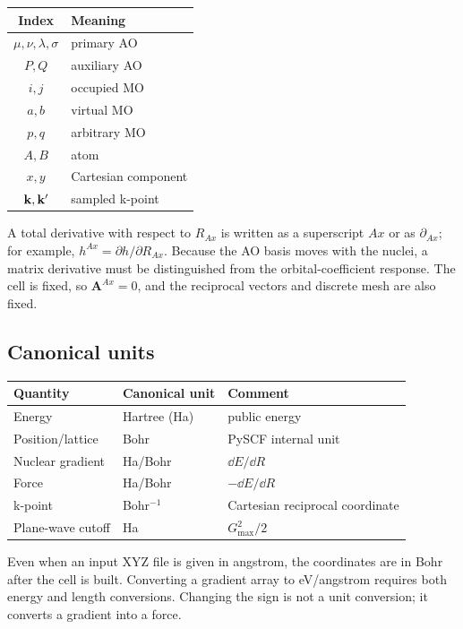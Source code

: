 \begin{center}
\begin{tabular}{cl}
\toprule
Index & Meaning \\
\midrule
$\mu,\nu,\lambda,\sigma$ & primary AO \\
$P,Q$ & auxiliary AO \\
$i,j$ & occupied MO \\
$a,b$ & virtual MO \\
$p,q$ & arbitrary MO \\
$A,B$ & atom \\
$x,y$ & Cartesian component \\
$\mathbf{k},\mathbf{k}'$ & sampled k-point \\
\bottomrule
\end{tabular}
\end{center}

A total derivative with respect to $R_{Ax}$ is written as a superscript $Ax$
or as $\partial_{Ax}$; for example,
$h^{Ax}=\partial h/\partial R_{Ax}$.  Because the AO basis moves with the
nuclei, a matrix derivative must be distinguished from the orbital-coefficient
response.  The cell is fixed, so $\mathbf A^{Ax}=0$, and the reciprocal vectors
and discrete mesh are also fixed.

\subsection{Canonical units}

\begin{center}
\begin{tabular}{lll}
\toprule
Quantity & Canonical unit & Comment \\
\midrule
Energy & Hartree (Ha) & public energy \\
Position/lattice & Bohr & PySCF internal unit \\
Nuclear gradient & Ha/Bohr & $\dd E/\dd R$ \\
Force & Ha/Bohr & $-\dd E/\dd R$ \\
k-point & Bohr$^{-1}$ & Cartesian reciprocal coordinate \\
Plane-wave cutoff & Ha & $G_{\max}^2/2$ \\
\bottomrule
\end{tabular}
\end{center}

Even when an input XYZ file is given in angstrom, the coordinates are in Bohr
after the cell is built.  Converting a gradient array to eV/angstrom requires
both energy and length conversions.  Changing the sign is not a unit
conversion; it converts a gradient into a force.
